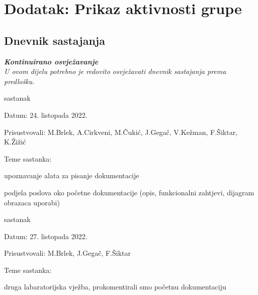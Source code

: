 \chapter*{Dodatak: Prikaz aktivnosti grupe}
		
		\section*{Dnevnik sastajanja}
		
		\textbf{\textit{Kontinuirano osvježavanje}}\\
		
		 \textit{U ovom dijelu potrebno je redovito osvježavati dnevnik sastajanja prema predlošku.}
		
		\begin{packed_enum}
			\item  sastanak
			
			\item[] \begin{packed_item}
				\item Datum: 24. listopada 2022.
				\item Prisustvovali: M.Brlek, A.Cirkveni, M.Čukić, J.Gegač, V.Kežman, F.Šiktar, K.Žižić
				\item Teme sastanka:
				\begin{packed_item}
					\item  upoznavanje alata za pisanje dokumentacije
					\item  podjela poslova oko početne dokumentacije (opis, funkcionalni zahtjevi, dijagram obrazaca uporabi)
				\end{packed_item}
			\end{packed_item}
			
			\item  sastanak
			\item[] \begin{packed_item}
				\item Datum: 27. listopada 2022.
				\item Prisustvovali: M.Brlek, J.Gegač, F.Šiktar
				\item Teme sastanka:
				\begin{packed_item}
					\item  druga labaratorijska vježba, prokomentirali smo početnu dokumentaciju
				\end{packed_item}
			\end{packed_item}
		

\end{packed_enum}
